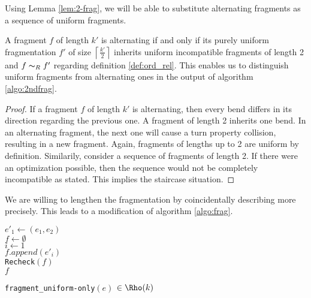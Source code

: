Using Lemma \ref{lem:2-frag}, we will be able to substitute alternating fragments as a sequence of uniform fragments.
\begin{lemma}
	A fragment $f$ of length $k'$ is alternating if and only if its purely uniform fragmentation $f'$ of size $\left\lceil\frac{k'}{2}\right\rceil$ inherits uniform incompatible fragments of length 2 and $f \thicksim_R f'$ regarding definition \ref{def:ord_rel}. This enables us to distinguish uniform fragments from alternating ones in the output of algorithm \ref{algo:2ndfrag}.\label{lem:alt_2uni}
\end{lemma}
\begin{proof}
	If a fragment $f$ of length $k'$ is alternating, then every bend differs in its direction regarding the previous one. A fragment of length 2 inherits one bend. In an alternating fragment, the next one will cause a turn property collision, resulting in a new fragment. Again, fragments of lengths up to 2 are uniform by definition. Similarily, consider a sequence of fragments of length 2. If there were an optimization possible, then the sequence would not be completely incompatible as stated. This implies the staircase situation.
\end{proof}
We are willing to lengthen the fragmentation by coincidentally describing more precisely. This leads to a modification of algorithm \ref{algo:frag}.\\
\begin{algorithm}[H]
	$e'_1 \gets (e_1,e_2)$\\
	$f \gets \emptyset$\\
	$i \gets 1$\\
	$f.append(e'_i)$\\
	\texttt{Recheck}$(f)$\label{algo:2ndfrag_recheck}\\
	\Return $f$
	\caption{\texttt{fragment\_uniform-only}$(e)$ $\in \Rho(k)$}\label{algo:2ndfrag}
\end{algorithm}
